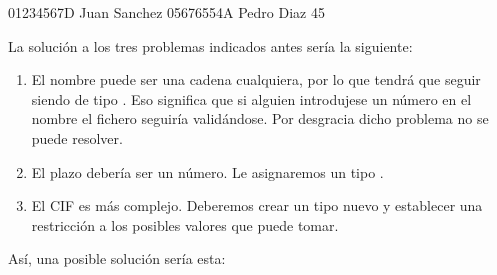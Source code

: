 \documentclass[letterpaper,10pt,spanish]{sphinxmanual}
\begin{document}
\begin{sphinxVerbatim}[commandchars=\\\{\}]
        01234567D
        Juan Sanchez
        05676554A
        Pedro Diaz
        45
\end{sphinxVerbatim}

La solución a los tres problemas indicados antes sería la siguiente:
\begin{enumerate}
\item {} 
El nombre puede ser una cadena cualquiera, por lo que tendrá que seguir siendo de tipo . Eso significa que si alguien introdujese un número en el nombre el fichero seguiría validándose. Por desgracia dicho problema no se puede resolver.

\item {} 
El plazo debería ser un número. Le asignaremos un tipo .

\item {} 
El CIF es más complejo. Deberemos crear un tipo nuevo y establecer una restricción a los posibles valores que puede tomar.

\end{enumerate}

Así, una posible solución sería esta:
\end{document}
